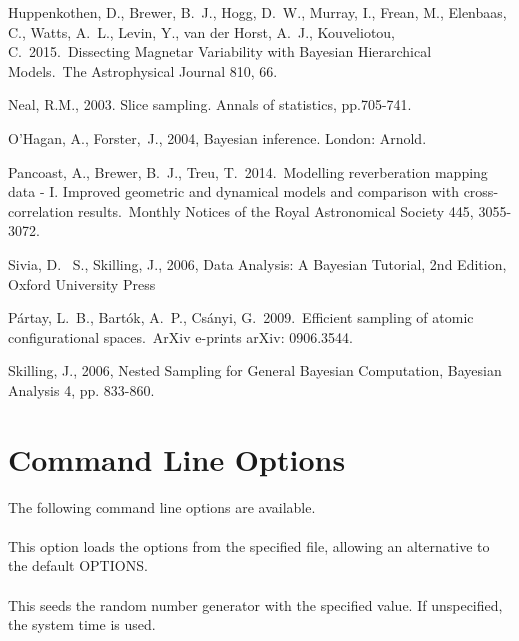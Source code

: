 \documentclass[article]{jss}
\begin{document}
\begin{thebibliography}{99}
 Huppenkothen, D., Brewer, B.~J., Hogg, D.~W., Murray, I., Frean, M., Elenbaas, C., Watts, A.~L., Levin, Y., van der Horst, A.~J., Kouveliotou, C.\ 2015.\ Dissecting Magnetar Variability with Bayesian Hierarchical Models.\ The Astrophysical Journal 810, 66. 

Neal, R.M., 2003. Slice sampling. Annals of statistics, pp.705-741.

O'Hagan, A., Forster,~J., 2004, Bayesian inference. London: Arnold.

 Pancoast, A., Brewer, B.~J., Treu, T.\ 2014.\ Modelling reverberation mapping data - I. Improved geometric and dynamical models and comparison with cross-correlation results.\ Monthly Notices of the Royal Astronomical Society 445, 3055-3072.

 Sivia, 
D.~ S., Skilling, J., 2006, Data Analysis: A Bayesian Tutorial, 2nd 
Edition, Oxford University Press

 P{\'a}rtay, L.~B., 
Bart{\'o}k, A.~P., Cs{\'a}nyi, G.\ 2009.\ Efficient sampling of atomic 
configurational spaces.\ ArXiv e-prints arXiv: 0906.3544. 

 Skilling, J., 2006, Nested Sampling for General Bayesian Computation, Bayesian Analysis 4, pp. 833-860.

\end{thebibliography}

\appendix
\section{Command Line Options}\label{sec:command_line_options}
The following command line options are available.\\

\\
This option loads the  options from the specified file, allowing
an alternative to the default OPTIONS.\\

\\
This seeds the random number generator with the specified value. If unspecified, the system time is used.\\
\end{document}
